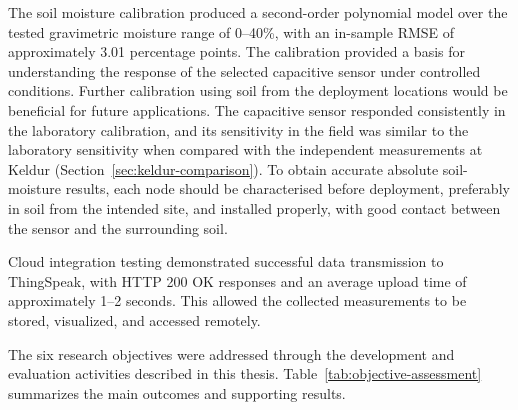 The soil moisture calibration produced a second-order polynomial model over the tested gravimetric moisture range of 0--40\%, with an in-sample RMSE of approximately 3.01 percentage points. The calibration provided a basis for understanding the response of the selected capacitive sensor under controlled conditions. Further calibration using soil from the deployment locations would be beneficial for future applications. The capacitive sensor responded consistently in the laboratory calibration, and its sensitivity in the field was similar to the laboratory sensitivity when compared with the independent measurements at Keldur (Section~\ref{sec:keldur-comparison}). To obtain accurate absolute soil-moisture results, each node should be characterised before deployment, preferably in soil from the intended site, and installed properly, with good contact between the sensor and the surrounding soil.

Cloud integration testing demonstrated successful data transmission to ThingSpeak, with HTTP 200 OK responses and an average upload time of approximately 1--2 seconds. This allowed the collected measurements to be stored, visualized, and accessed remotely.

The six research objectives were addressed through the development and evaluation activities described in this thesis. Table~\ref{tab:objective-assessment} summarizes the main outcomes and supporting results.

